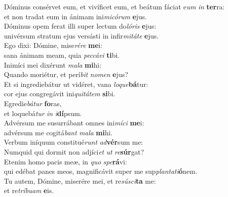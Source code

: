 \evenverse Dóminus consérvet eum, et vivíficet eum, et beátum fáciat e\textit{um} \textit{in} \textbf{ter}ra:~\*\\
\evenverse et non tradat eum in ánimam ini\textit{mi}\textit{có}\textit{rum} \textbf{e}jus.\\
\oddverse Dóminus opem ferat illi super lectum do\textit{ló}\textit{ris} \textbf{e}jus:~\*\\
\oddverse univérsum stratum ejus versásti in infir\textit{mi}\textit{tá}\textit{te} \textbf{e}jus.\\
\evenverse Ego dixi: Dómine, mise\textit{ré}\textit{re} \textbf{me}i:~\*\\
\evenverse sana ánimam meam, quia \textit{pec}\textit{cá}\textit{vi} \textbf{ti}bi.\\
\oddverse Inimíci mei dixérunt \textit{ma}\textit{la} \textbf{mi}hi:~\*\\
\oddverse Quando moriétur, et perí\textit{bit} \textit{no}\textit{men} \textbf{e}jus?\\
\evenverse Et si ingrediebátur ut vidéret, vana \textit{lo}\textit{que}\textbf{bá}tur:~\*\\
\evenverse cor ejus congregávit ini\textit{qui}\textit{tá}\textit{tem} \textbf{si}bi.\\
\oddverse Egredie\textit{bá}\textit{tur} \textbf{fo}ras,~\*\\
\oddverse et loquebá\textit{tur} \textit{in} \textit{i}\textbf{dí}psum.\\
\evenverse Advérsum me susurrábant omnes ini\textit{mí}\textit{ci} \textbf{me}i:~\*\\
\evenverse advérsum me cogitá\textit{bant} \textit{ma}\textit{la} \textbf{mi}hi.\\
\oddverse Verbum iníquum constitué\textit{runt} \textit{ad}\textbf{vér}sum me:~\*\\
\oddverse Numquid qui dormit non adjíci\textit{et} \textit{ut} \textit{re}\textbf{súr}gat?\\
\evenverse Etenim homo pacis meæ, in \textit{quo} \textit{spe}\textbf{rá}vi:~\*\\
\evenverse qui edébat panes meos, magnificávit super me sup\textit{plan}\textit{ta}\textit{ti}\textbf{ó}nem.\\
\oddverse Tu autem, Dómine, miserére mei, et re\textit{sú}\textit{sci}\textbf{ta} me:~\*\\
\oddverse et re\textit{trí}\textit{bu}\textit{am} \textbf{e}is.\\
